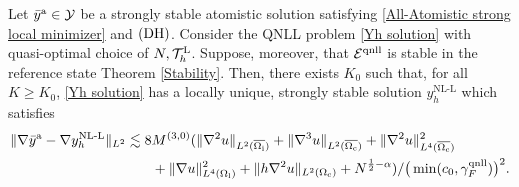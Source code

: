 \begin{theorem}
	Let $\bar{y}^{{\rm a}} \in \mathcal{Y}$ be a strongly stable atomistic solution satisfying \eqref{All-Atomistic strong local minimizer} and $\textbf{\rm (DH)}$. Consider the QNLL problem \eqref{Yh solution} with quasi-optimal choice of $N, \mathcal{T}_{h}^{{\rm L}}$. Suppose, moreover, that $\mathcal{E}^{{\rm qnll}}$ is stable in the reference state Theorem \ref{Stability}. Then, there exists $K_0$ such that, for all $K \ge K_0$, \eqref{Yh solution} has a locally unique, strongly stable solution $y^{\text{NL-L}}_{h}$ which satisfies
	\begin{equation}
		\begin{aligned}
			\Vert \nabla\bar{y}^{{\rm a}} - \nabla y^{\text{NL-L}}_{h} \Vert_{L^2} \lesssim 8&M^{(3,0)}(\Vert \nabla^{2} u\Vert_{L^{2}(\overline{\Omega_{{\rm i}}})} +\Vert \nabla^{3}u \Vert_{L^{2}(\overline{\Omega_{{\rm c}}})}+\Vert \nabla^{2}u \Vert^{2}_{L^{4}(\overline{\Omega_{{\rm c}}})}\\
			&+ \Vert \nabla u \Vert^{2}_{L^{4}(\Omega_{{\rm l}})}+\Vert h \nabla^{2} u\Vert_{L^{2}(\Omega_{{\rm c}})}+N^{\frac{1}{2}-\alpha})/\big(\min(c_{0},\gamma^{{\rm qnll}}_{F})\big)^2.
		\end{aligned}
	\end{equation}
	
\end{theorem}
